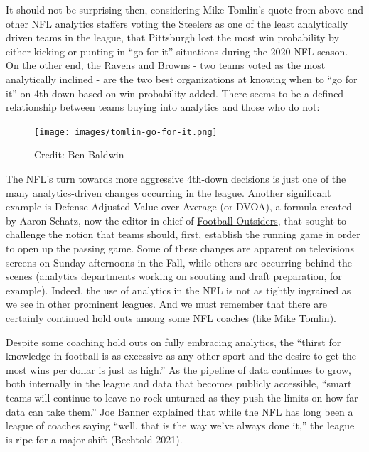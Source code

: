 \documentclass[
  letterpaper,
]{krantz}
\begin{document}
It should not be surprising then, considering Mike Tomlin's quote from
above and other NFL analytics staffers voting the Steelers as one of the
least analytically driven teams in the league, that Pittsburgh lost the
most win probability by either kicking or punting in ``go for it''
situations during the 2020 NFL season. On the other end, the Ravens and
Browns - two teams voted as the most analytically inclined - are the two
best organizations at knowing when to ``go for it'' on 4th down based on
win probability added. There seems to be a defined relationship between
teams buying into analytics and those who do not:

\begin{figure}

{\centering \texttt{[image: images/tomlin-go-for-it.png]}

}

\caption{Credit: Ben Baldwin}

\end{figure}

The NFL's turn towards more aggressive 4th-down decisions is just one of
the many analytics-driven changes occurring in the league. Another
significant example is Defense-Adjusted Value over Average (or DVOA), a
formula created by Aaron Schatz, now the editor in chief of
\href{https://www.footballoutsiders.com/info/methods\#dvoa}{Football
Outsiders}, that sought to challenge the notion that teams should,
first, establish the running game in order to open up the passing game.
Some of these changes are apparent on televisions screens on Sunday
afternoons in the Fall, while others are occurring behind the scenes
(analytics departments working on scouting and draft preparation, for
example). Indeed, the use of analytics in the NFL is not as tightly
ingrained as we see in other prominent leagues. And we must remember
that there are certainly continued hold outs among some NFL coaches
(like Mike Tomlin).

Despite some coaching hold outs on fully embracing analytics, the
``thirst for knowledge in football is as excessive as any other sport
and the desire to get the most wins per dollar is just as high.'' As the
pipeline of data continues to grow, both internally in the league and
data that becomes publicly accessible, ``smart teams will continue to
leave no rock unturned as they push the limits on how far data can take
them.'' Joe Banner explained that while the NFL has long been a league
of coaches saying ``well, that is the way we've always done it,'' the
league is ripe for a major shift (Bechtold 2021).
\end{document}
